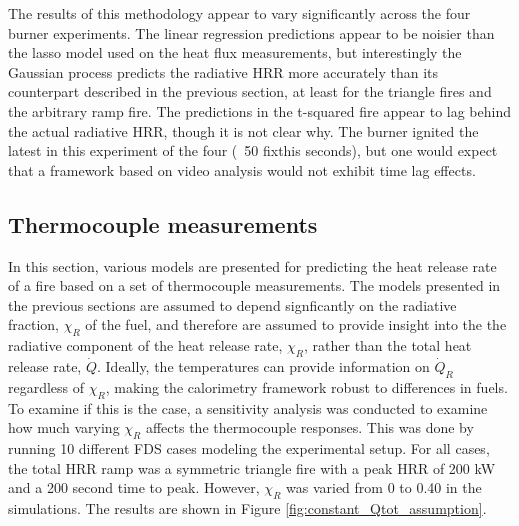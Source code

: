 \documentclass{article}
\begin{document}
The results of this methodology appear to vary significantly across the four burner experiments. The linear regression predictions appear to be noisier than the lasso model used on the heat flux measurements, but interestingly the Gaussian process predicts the radiative HRR more accurately than its counterpart described in the previous section, at least for the triangle fires and the arbitrary ramp fire. The predictions in the t-squared fire appear to lag behind the actual radiative HRR, though it is not clear why. The burner ignited the latest in this experiment of the four (~50 fixthis seconds), but one would expect that a framework based on video analysis would not exhibit time lag effects. 


\clearpage
\subsection{Thermocouple measurements}
In this section, various models are presented for predicting the heat release rate of a fire based on a set of thermocouple measurements. The models presented in the previous sections are assumed to depend signficantly on the radiative fraction, $\chi_R$ of the fuel, and therefore are assumed to provide insight into the the radiative component of the heat release rate, $\chi_R$, rather than the total heat release rate, $\dot{Q}$. Ideally, the temperatures can provide information on $\dot{Q}_R$ regardless of $\chi_R$, making the calorimetry framework robust to differences in fuels. To examine if this is the case, a sensitivity analysis was conducted to examine how much varying $\chi_R$ affects the thermocouple responses. This was done by running 10 different FDS cases modeling the experimental setup. For all cases, the total HRR ramp was a symmetric triangle fire with a peak HRR of 200 kW and a 200 second time to peak. However, $\chi_R$ was varied from 0 to 0.40 in the simulations. The results are shown in Figure \ref{fig:constant_Qtot_assumption}. 
\end{document}
